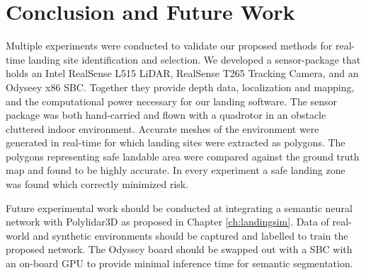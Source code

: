 \section{Conclusion and Future Work}

Multiple experiments were conducted to validate our proposed methods for real-time landing site identification and selection. We developed a sensor-package that holds an Intel RealSense L515 LiDAR, RealSense T265 Tracking Camera, and an Odyseey x86 \acf{SBC}. Together they provide depth data, localization and mapping, and the computational power necessary for our landing software. The sensor package was both hand-carried and flown with a quadrotor in an obstacle cluttered indoor environment. Accurate meshes of the environment were generated in real-time for which landing sites were extracted as polygons. The polygons representing safe landable area were compared against the ground truth map and found to be highly accurate. In every experiment a safe landing zone was found which correctly minimized risk. 

Future experimental work should be conducted at integrating a semantic neural network with Polylidar3D as proposed in Chapter \ref{ch:landingsim}. Data of real-world and synthetic environments should be captured and labelled to train the proposed network. The Odyssey board should be swapped out with a \ac{SBC} with an on-board \ac{GPU} to provide minimal inference time for semantic segmentation.









